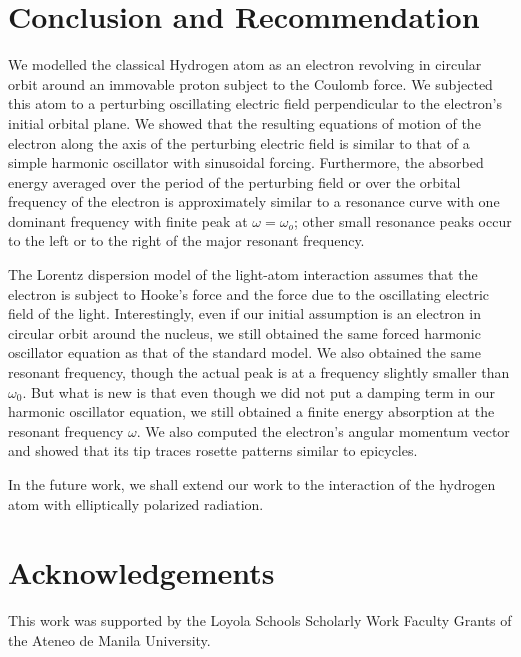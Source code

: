 \documentclass[twocolumn,showpacs,preprintnumbers,amsmath,amssymb]{revtex4}
\begin{document}
\section{Conclusion and Recommendation}

We modelled the classical Hydrogen atom as an electron revolving in circular orbit around an immovable proton subject to the Coulomb force. We subjected this atom to a perturbing oscillating electric field perpendicular to the electron's initial orbital plane. We showed that the resulting equations of motion of the electron along the axis of the perturbing electric field is similar to that of a simple harmonic oscillator with sinusoidal forcing.  Furthermore, the absorbed energy averaged over the period of the perturbing field or over the orbital frequency of the electron is approximately similar to a resonance curve with one dominant frequency with finite peak at $\omega = \omega_o$; other small resonance peaks occur to the left or to the right of the major resonant frequency.  

The Lorentz dispersion model of the light-atom interaction assumes that the electron is subject to Hooke's force and the force due to the oscillating electric field of the light. Interestingly, even if our initial assumption is an electron in circular orbit around the nucleus, we still obtained the same forced harmonic oscillator equation as that of the standard model. We also obtained the same resonant frequency, though the actual peak is at a frequency slightly smaller than $\omega_0$. But what is new is that even though we did not put a damping term in our harmonic oscillator equation, we still obtained a finite energy absorption at the resonant frequency $\omega$. We also computed the electron's angular momentum vector and showed that its tip traces rosette patterns similar to epicycles\cite{gallavotti2001quasi}. 

In the future work, we shall extend our work to the interaction of the hydrogen atom with elliptically polarized radiation.


\section*{Acknowledgements}
This work was supported by the Loyola Schools Scholarly Work Faculty Grants of the Ateneo de Manila University.

%

\end{document}
